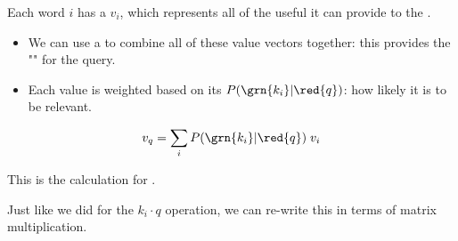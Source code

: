         \begin{kequation}
            Each word $i$ has a  $v_i$, which represents all of the useful  it can provide to the .

            \begin{itemize}
                \item We can use a  to combine all of these value vectors together: this provides the "" for the query.

                \item Each value is weighted based on its  $P(\grn{k_i}|\red{q}) $: how likely it is to be relevant.
            \end{itemize}

            \begin{equation*}
                v_{q} = 
                    \sum_i P(\grn{k_i}|\red{q}) \; v_{i}
            \end{equation*}

            This is the calculation for .
        \end{kequation}

        Just like we did for the $k_i \cdot q$ operation, we can re-write this in terms of matrix multiplication.

